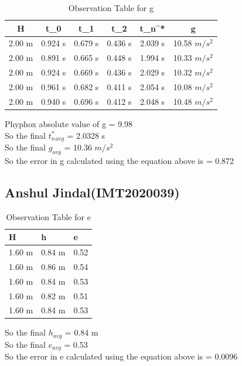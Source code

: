 \documentclass[11pt]{scrartcl} %
\begin{document}
\begin{table}[h]
\centering
\begin{tabular}{||c c c c c c||} 
\toprule
 \hline
 H & t_0 & t_1 & t_2 & t_n^* & g \\ [0.5ex] 
 \midrule
 \hline\hline
 2.00 m & 0.924 s & 0.679 s  & 0.436 s & 2.039 s & 10.58 $m/s^2$  \\ 
 \hline
 2.00 m & 0.891 s & 0.665 s & 0.448 s & 1.994 s & 10.33 $m/s^2$  \\
 \hline
 2.00 m & 0.924 s & 0.669 s & 0.436 s & 2.029 s  & 10.32 $m/s^2$   \\
 \hline
 2.00 m & 0.961 s & 0.682 s & 0.411 s & 2.054 s  & 10.08 $m/s^2$   \\
 \hline
 2.00 m & 0.940 s & 0.696 s & 0.412 s & 2.048 s  & 10.48 $m/s^2$  \\ [1ex]
 \bottomrule
 \hline
\end{tabular}
\caption{Observation Table for g}
\end{table}
Phyphox absolute value of g = 9.98 \\
So the final $t_n^*_{avg}$ = 2.0328 s\\
So the final $g_{avg}$ = 10.36 $m/s^2$\\
So the error in g calculated using the equation above is  = 0.872 \\

\newpage
\subsection{Anshul Jindal(IMT2020039)}

\begin{table}[h] %
	\centering %
	\begin{tabular}{l l l}
		\toprule
		\textbf{H} & \textbf{h} & \textbf{e} \\
		\midrule
		1.60 m & 0.84 m & 0.52\\
        1.60 m & 0.86 m & 0.54\\
        1.60 m & 0.84 m & 0.53\\
        1.60 m & 0.82 m & 0.51 \\
        1.60 m & 0.84 m & 0.53 \\
		\bottomrule
	\end{tabular}
	\caption{Observation Table for e}
\end{table}
So the final $h_{avg}$ = 0.84 m\\
So the final $e_{avg}$ = 0.53\\
So the error in e calculated using the equation above is  = 0.0096 
\end{document}
